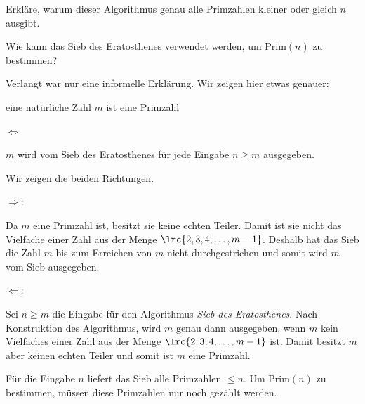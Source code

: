 	\begin{myexercise}
		\begin{aenum}
			\item Erkläre, warum dieser Algorithmus genau alle Primzahlen kleiner oder gleich $n$ ausgibt.
			\item Wie kann das Sieb des Eratosthenes verwendet werden, um $\text{Prim}(n)$ zu bestimmen?
		\end{aenum}
		\begin{myanswer}
			\begin{aenum}
				\item Verlangt war nur eine informelle Erklärung. Wir zeigen hier etwas genauer:
				\begin{center}
					eine natürliche Zahl $m$ ist eine Primzahl

					$\Longleftrightarrow$

					$m$ wird vom Sieb des Eratosthenes für jede Eingabe $n\geq m$ ausgegeben.
				\end{center}
				Wir zeigen die beiden Richtungen.

				$\Rightarrow$:

				Da $m$ eine Primzahl ist, besitzt sie keine echten Teiler. Damit ist sie nicht das Vielfache einer Zahl aus der Menge $\lrc{2,3,4, \ldots , m-1}$.
				Deshalb hat das Sieb die Zahl $m$ bis zum Erreichen von $m$ nicht durchgestrichen und somit wird $m$ vom Sieb ausgegeben.

				$\Leftarrow$:

				Sei $n\geq m$ die Eingabe für den Algorithmus \textit{Sieb des Eratosthenes}. Nach Konstruktion des Algorithmus, wird $m$ genau dann ausgegeben, wenn $m$ kein Vielfaches einer Zahl aus der Menge $\lrc{2,3,4, \ldots , m-1}$ ist. Damit besitzt $m$ aber keinen echten Teiler und somit ist $m$ eine Primzahl.
				\item Für die Eingabe $n$ liefert das Sieb alle Primzahlen $\leq n$. Um $\text{Prim}(n)$ zu bestimmen, müssen diese Primzahlen nur noch gezählt werden.
			\end{aenum}
		\end{myanswer}
	\end{myexercise}

